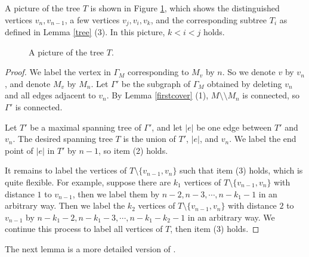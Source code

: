 \documentclass{amsart}
\numberwithin{equation}{section}
\theoremstyle{definition}
\begin{document}
A picture of the tree $T$ is shown in Figure \ref{Figure2}, which shows the distinguished vertices $v_n,v_{n-1}$, a few vertices $v_j,v_i,v_k$, and the corresponding subtree $T_i$ as defined in Lemma \ref{tree} (3). In this picture, $k<i<j$ holds.

\begin{figure}[htbp]
    \centering
    \def\svgwidth{4in} %
   
    \caption{A picture of the tree $T$.}
     \label{Figure2}
\end{figure}

\begin{proof}
We label the vertex in $\Gamma_M$ corresponding to $M_v$ by $n$. So we denote $v$ by $v_n$, and denote $M_v$ by $M_n$. Let $\Gamma'$ be the subgraph of $\Gamma_M$ obtained by deleting $v_n$ and all edges adjacent to $v_n$.  By Lemma \ref{firstcover} (1), $M\setminus\setminus M_n$ is connected, so $\Gamma'$ is connected. 

Let $T'$ be a maximal spanning tree of $\Gamma'$, and let $|e|$ be one edge between $T'$ and $v_n$. The desired spanning tree $T$ is the union of $T'$, $|e|$, and $v_n$. We label the end point of $|e|$ in $T'$ by $n-1$, so item (2) holds. 


It remains to label the vertices of $T\setminus \{v_{n-1},v_n\}$ such that item (3) holds, which is quite flexible. For example, suppose there are $k_1$ vertices of $T\setminus \{v_{n-1},v_n\}$ with distance $1$ to $v_{n-1}$, then we label them by $n-2,n-3,\cdots,n-k_1-1$ in an arbitrary way. Then we label the $k_2$ vertices of $T\setminus  \{v_{n-1},v_n\}$ with distance $2$ to $v_{n-1}$ by $n-k_1-2,n-k_1-3,\cdots,n-k_1-k_2-1$ in an arbitrary way. We continue this process to label all vertices of $T$, then item (3) holds.
\end{proof}

The next lemma is a more detailed version of \cite[Lemma 3.2]{WY}.
\end{document}
